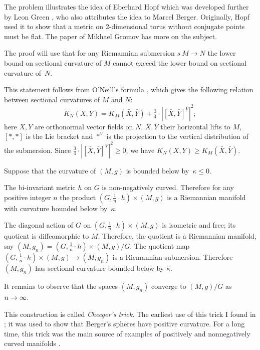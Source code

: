 The problem illustrates the idea of Eberhard Hopf \cite{hopf-conjugate}
which was developed further by Leon Green \cite{green,green1963}, who also attributes the idea to Marcel Berger.
Originally, Hopf used it to show that a metric on 2-dimensional torus without conjugate points must be flat.
The paper of Mikhael Gromov \cite{gromov2021} has more on the subject.









 The proof will use that for any Riemannian submersion $s\:M\to N$
the lower bound on sectional curvature of $M$ cannot exceed the lower bound on sectional curvature of~$N$.

This statement follows from O'Neill's formula \cite[Theorem 3.20]{cheeger-ebin},
which gives the following relation between sectional curvatures of $M$ and $N$:
\[K_N(X,Y)=K_M(\bar X, \bar Y)+\tfrac34\cdot|[\bar X,\bar Y]^V|^2;\]
here $X,Y$ are orthonormal vector fields on $N$, $\bar X, \bar Y$ their horizontal lifts to $M$, $[{*},{*}]$ is the Lie bracket and ${*}^V$ is the projection to the vertical distribution of the submersion.
Since $\tfrac34\cdot|[\bar X,\bar Y]^V|^2\ge 0$, we have $K_N(X,Y)\ge K_M(\bar X, \bar Y)$.

\medskip




Suppose that the curvature of $(M,g)$ is bounded below by~$\kappa\le 0$.

The bi-invariant metric $h$ on $G$ is non-negatively curved.
Therefore for any positive integer $n$ the product $(G,\tfrac1n\cdot h)\times (M,g)$ is a Riemannian manifold with  curvature bounded below by~$\kappa$.

The diagonal action of $G$ on $(G,\tfrac1n\cdot h)\times (M,g)$ is isometric and free; its quotient is diffeomorphic to $M$.
Therefore,
the quotient
is a Riemannian manifold, say $(M,g_n)=(G,\tfrac1n\cdot h)\times (M,g)/G$.
The quotient map $(G,\tfrac1n\cdot h)\times (M,g)\to (M,g_n)$ is a Riemannian submersion.
Therefore $(M,g_n)$ has sectional curvature bounded below by $\kappa$.

It remains to observe that the spaces $(M,g_n)$ converge to $(M,g)/G$ as $n\z\to \infty$.\qeds

This construction is called \emph{Cheeger's trick}.
The earliest use of this trick I found in \cite{GKM}; 
it was used to show that Berger's spheres have positive curvature.
For a long time, this trick was the main source of examples
of positively and nonnegatively curved manifolds
\cite{cheeger,aloff-wallach,gromoll-meyer,eschenburg-spaces,bazajkin}.
 

